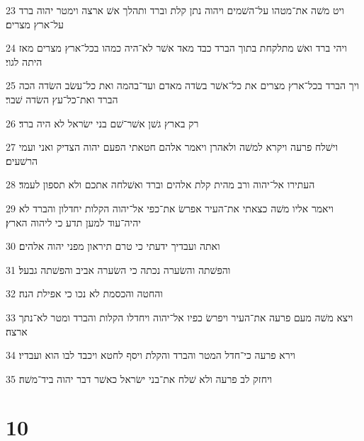 \par 23 ויט משׁה את־מטהו על־השׁמים ויהוה נתן קלת וברד ותהלך אשׁ ארצה וימטר יהוה ברד על־ארץ מצרים׃
\par 24 ויהי ברד ואשׁ מתלקחת בתוך הברד כבד מאד אשׁר לא־היה כמהו בכל־ארץ מצרים מאז היתה לגוי׃
\par 25 ויך הברד בכל־ארץ מצרים את כל־אשׁר בשׂדה מאדם ועד־בהמה ואת כל־עשׂב השׂדה הכה הברד ואת־כל־עץ השׂדה שׁבר׃
\par 26 רק בארץ גשׁן אשׁר־שׁם בני ישׂראל לא היה ברד׃
\par 27 וישׁלח פרעה ויקרא למשׁה ולאהרן ויאמר אלהם חטאתי הפעם יהוה הצדיק ואני ועמי הרשׁעים׃
\par 28 העתירו אל־יהוה ורב מהית קלת אלהים וברד ואשׁלחה אתכם ולא תספון לעמד׃
\par 29 ויאמר אליו משׁה כצאתי את־העיר אפרשׂ את־כפי אל־יהוה הקלות יחדלון והברד לא יהיה־עוד למען תדע כי ליהוה הארץ׃
\par 30 ואתה ועבדיך ידעתי כי טרם תיראון מפני יהוה אלהים׃
\par 31 והפשׁתה והשׂערה נכתה כי השׂערה אביב והפשׁתה גבעל׃
\par 32 והחטה והכסמת לא נכו כי אפילת הנה׃
\par 33 ויצא משׁה מעם פרעה את־העיר ויפרשׂ כפיו אל־יהוה ויחדלו הקלות והברד ומטר לא־נתך ארצה׃
\par 34 וירא פרעה כי־חדל המטר והברד והקלת ויסף לחטא ויכבד לבו הוא ועבדיו׃
\par 35 ויחזק לב פרעה ולא שׁלח את־בני ישׂראל כאשׁר דבר יהוה ביד־משׁה׃

\chapter{10}

